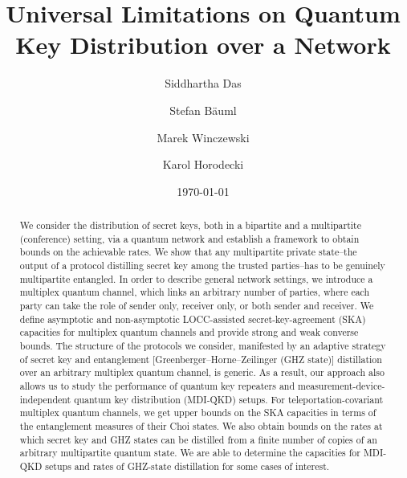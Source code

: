 \documentclass[aps,pra,twocolumn,superscriptaddress,longbibliography]{revtex4-1}
\begin{document}
\widetext

\title{Universal Limitations on Quantum Key Distribution over a Network}

\author{Siddhartha Das}
\author{Stefan B\"{a}uml}
\author{Marek Winczewski}
\author{Karol Horodecki}

\date{\today}
\begin{abstract}
We consider the distribution of secret keys, both in a bipartite and a multipartite (conference) setting, via a quantum network and establish a framework to obtain bounds on the achievable rates. We show that any multipartite private state--the output of a protocol distilling secret key among the trusted parties--has to be genuinely multipartite entangled. In order to describe general network settings, we introduce a multiplex quantum channel, which links an arbitrary number of parties, where each party can take the role of sender only, receiver only, or both sender and receiver. We define asymptotic and non-asymptotic LOCC-assisted secret-key-agreement (SKA) capacities for multiplex quantum channels and provide strong and weak converse bounds. The structure of the protocols we consider, manifested by an adaptive strategy of secret key and entanglement [Greenberger–Horne–Zeilinger (GHZ state)] distillation over an arbitrary multiplex quantum channel, is generic. As a result, our approach also allows us to study the performance of quantum key repeaters and measurement-device-independent quantum key distribution (MDI-QKD) setups. For teleportation-covariant multiplex quantum channels, we get upper bounds on the SKA capacities in terms of the entanglement measures of their Choi states. We also obtain bounds on the rates at which secret key and GHZ states can be distilled from a finite number of copies of an arbitrary multipartite quantum state. We are able to determine the capacities for MDI-QKD setups and rates of GHZ-state distillation for some cases of interest. 

\end{abstract}
\end{document}
